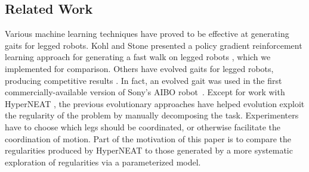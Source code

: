 \subsection{Related Work}

Various machine learning techniques have proved to be effective at
generating gaits for legged robots. Kohl and Stone presented a policy
gradient reinforcement learning approach for generating a fast walk on
legged robots \citep{kohl}, which we implemented for
comparison. Others have evolved gaits for legged robots, producing
competitive results \citep{chernova2005evolutionary,
  hornby2005autonomous, zykov, clune2009evolving,
  clune2011performance, clune2009hybrid, clune2009sensitivity,
  tellez2006evolving, valsalam2008modular}. In fact, an evolved gait
was used in the first commercially-available version of Sony's AIBO
robot~\citep{hornby2005autonomous}. Except for work with HyperNEAT
\citep{clune2009evolving, clune2011performance, clune2009hybrid,
  clune2009sensitivity}, the previous evolutionary approaches have
helped evolution exploit the regularity of the problem by manually
decomposing the task. Experimenters have to choose which legs should
be coordinated, or otherwise facilitate the coordination of
motion. Part of the motivation of this paper is to compare the
regularities produced by HyperNEAT to those generated by a more
systematic exploration of regularities via a parameterized model.
